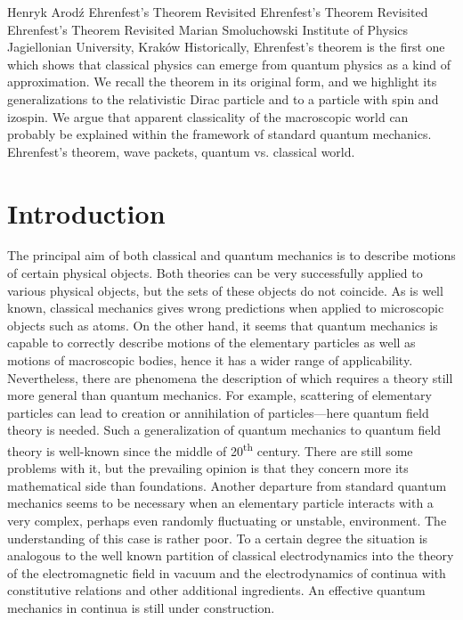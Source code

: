 \begin{artengenv}{Henryk Arod\'z}
	{Ehrenfest's Theorem Revisited}
	{Ehrenfest's Theorem Revisited}
	{Ehrenfest's Theorem Revisited}
	{Marian Smoluchowski Institute of Physics \\ Jagiellonian University, Krak\'ow\label{arodz-start}}
	{Historically, Ehrenfest's theorem \parencite*{ehr} is the first one which shows that classical physics can emerge from quantum physics as a kind of approximation. We recall the theorem in its original form, and we highlight its generalizations to the relativistic Dirac particle and to a particle with spin and izospin. We argue that apparent classicality of the macroscopic world can probably be explained within the framework of standard quantum mechanics.}
	{Ehrenfest's theorem, wave packets, quantum vs. classical world.}







\section{Introduction}


\lettrine[loversize=0.13,lines=2,lraise=-0.05,nindent=0em,findent=0.2pt]%
{T}{}he principal aim of both classical and quantum mechanics is to describe motions of certain physical objects. Both theories can be very successfully applied to various physical objects, but the sets of these objects do not coincide. As is well known, classical mechanics gives wrong predictions when applied to microscopic objects such as atoms. On the other hand, it seems that quantum mechanics is capable to correctly describe motions of the elementary particles as well as motions of macroscopic bodies, hence it has a wider range of applicability. Nevertheless, there are phenomena the description of which requires a theory still more general than quantum mechanics. For example, scattering of elementary particles can lead to creation or annihilation of particles---here quantum field theory is needed. Such a generalization of quantum mechanics to quantum field theory is well-known since the middle of 20\textsuperscript{th} century. There are still some problems with it, but the prevailing opinion is that they concern more its mathematical side than foundations. Another departure from standard quantum mechanics seems to be necessary when an elementary particle interacts with a very complex, perhaps even randomly fluctuating or unstable, environment. The understanding of this case is rather poor. To a certain degree the situation is analogous to the well known partition of classical electrodynamics into the theory of the electromagnetic field in vacuum and the electrodynamics of 
continua with constitutive relations and other additional ingredients. An effective quantum mechanics in continua is still 
under construction. 






\end{artengenv}
